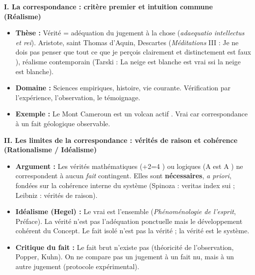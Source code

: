 \documentclass[11pt]{article}
\newcommand{\cle}[1]{{\popxbold\color{popdark}#1}}
\begin{document}
\begin{exoresolu}
\textbf{I. La correspondance : critère premier et intuition commune (Réalisme)}
\begin{itemize}
    \item \textbf{Thèse :} Vérité = adéquation du jugement à la chose (\emph{adaequatio intellectus et rei}). Aristote, saint Thomas d'Aquin, Descartes (\emph{Méditations} III : \guillemotleft Je ne dois pas penser que tout ce que je perçois clairement et distinctement est faux \guillemotright), réalisme contemporain (Tarski : \guillemotleft La neige est blanche \guillemotright est vrai ssi la neige est blanche).
    \item \textbf{Domaine :} Sciences empiriques, histoire, vie courante. Vérification par l'expérience, l'observation, le témoignage.
    \item \textbf{Exemple :} \guillemotleft Le Mont Cameroun est un volcan actif \guillemotright. Vrai car correspondance à un fait géologique observable.
\end{itemize}

\textbf{II. Les limites de la correspondance : vérités de raison et cohérence (Rationalisme / Idéalisme)}
\begin{itemize}
    \item \textbf{Argument :} Les vérités mathématiques (+2=4 \guillemotright) ou logiques (\guillemotleft A est A \guillemotright) ne correspondent à aucun \emph{fait} contingent. Elles sont \textbf{nécessaires}, \emph{a priori}, fondées sur la \cle{cohérence} interne du système (Spinoza : \guillemotleft veritas index sui \guillemotright ; Leibniz : vérités de raison).
    \item \textbf{Idéalisme (Hegel) :} \guillemotleft Le vrai est l'ensemble \guillemotright (\emph{Phénoménologie de l'esprit}, Préface). La vérité n'est pas l'adéquation ponctuelle mais le développement cohérent du Concept. Le fait isolé n'est pas la vérité ; la vérité est le système.
    \item \textbf{Critique du fait :} Le \guillemotleft fait brut \guillemotright n'existe pas (théoricité de l'observation, Popper, Kuhn). On ne compare pas un jugement à un fait nu, mais à un autre jugement (protocole expérimental).
\end{itemize}


\end{exoresolu}
\end{document}
